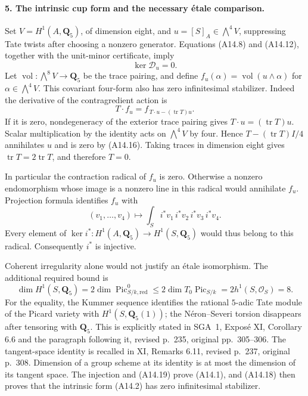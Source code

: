\documentclass[11pt]{article}
\theoremstyle{remark}\newtheorem{remark}[theorem]{Remark}
\begin{document}
\paragraph{5. The intrinsic cup form and the necessary
\'etale comparison.}
Set $V=H^1(A,\mathbf Q_5)$, of dimension eight, and
$u=[S]_A\in\bigwedge^4V$, suppressing Tate twists after choosing
a nonzero generator. Equations (A14.8) and (A14.12), together
with the unit-minor certificate, imply
\[
                         \ker\mathcal D_u=0.
                                                               \tag{A14.16}
\]
Let $\operatorname{vol}:\bigwedge^8V\to\mathbf Q_5$ be the
trace pairing, and define
$f_u(\alpha)=\operatorname{vol}(u\wedge\alpha)$ for
$\alpha\in\bigwedge^4V$.
This covariant four-form also has zero infinitesimal stabilizer.
Indeed the derivative of the contragredient action is
\[
                  T\cdot f_u=f_{\,T\cdot u-(\operatorname{tr}T)u}.
                                                               \tag{A14.17}
\]
If it is zero, nondegeneracy of the exterior trace pairing gives
$T\cdot u=(\operatorname{tr}T)u$. Scalar multiplication by the
identity acts on $\bigwedge^4V$ by four. Hence
$T-(\operatorname{tr}T)I/4$ annihilates $u$ and is zero by
(A14.16). Taking traces in dimension eight gives
$\operatorname{tr}T=2\operatorname{tr}T$, and therefore $T=0$.

In particular the contraction radical of $f_u$ is zero.
Otherwise a nonzero endomorphism whose image is a nonzero line
in this radical would annihilate $f_u$.
Projection formula identifies $f_u$ with
\[
     (v_1,\ldots,v_4)\longmapsto
                 \int_S i^*v_1\,i^*v_2\,i^*v_3\,i^*v_4 .
                                                               \tag{A14.18}
\]
Every element of $\ker i^*:H^1(A,\mathbf Q_5)\to H^1(S,\mathbf Q_5)$
would thus belong to this radical. Consequently $i^*$ is injective.

Coherent irregularity alone would not justify an \'{e}tale
isomorphism. The additional required bound is
\[
 \dim H^1(S,\mathbf Q_5)
       =2\dim\operatorname{Pic}^0_{S/k,\mathrm{red}}
       \le2\dim T_0\operatorname{Pic}_{S/k}
       =2h^1(S,\mathcal O_S)=8.                              \tag{A14.19}
\]
For the equality, the Kummer sequence identifies the rational
$5$-adic Tate module of the Picard variety with
$H^1(S,\mathbf Q_5(1))$; the N\'eron--Severi torsion disappears
after tensoring with $\mathbf Q_5$. This is explicitly stated
in SGA~1, Expos\'e XI, Corollary 6.6 and the paragraph following
it, revised p.~235, original pp.~305--306.
The tangent-space identity is recalled in XI, Remarks 6.11,
revised p.~237, original p.~308. Dimension of a group scheme
at its identity is at most the dimension of its tangent space.
The injection and (A14.19) prove (A14.1), and (A14.18) then
proves that the intrinsic form (A14.2) has zero infinitesimal
stabilizer.
\end{document}
